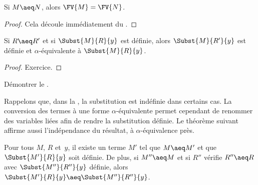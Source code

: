 \documentclass[../../../include/open-logic-section]{subfiles}
\begin{document}
\begin{thm}
Si $M \aeq N$, alors $\FV{M} = \FV{N}$.
\end{thm}

\begin{proof}
Cela découle immédiatement du
.
\end{proof}

\begin{lem}
Si $R \aeq R'$ et si $\Subst{M}{R}{y}$
est définie, alors $\Subst{M}{R'}{y}$
est définie et $\alpha$-équivalente à
$\Subst{M}{R}{y}$.
\end{lem}

\begin{proof}
Exercice.
\end{proof}

\begin{prob}
Démontrer le .
\end{prob}

Rappelons que, dans la , la
substitution est indéfinie dans certains cas.
La conversion des termes à une forme
$\alpha$-équivalente permet cependant de
renommer des variables liées afin de rendre
la substitution définie. Le théorème suivant
affirme aussi l'indépendance du résultat,
à $\alpha$-équivalence près.

\begin{thm}
Pour tous $M$, $R$ et~$y$, il existe un terme
$M'$ tel que $M \aeq M'$ et que
$\Subst{M'}{R}{y}$ soit définie. De plus,
si $M'' \aeq M$ et si $R''$ vérifie
$R'' \aeq R$ avec $\Subst{M''}{R''}{y}$
définie, alors
$\Subst{M'}{R}{y} \aeq
\Subst{M''}{R''}{y}$.
\end{thm}
\end{document}
